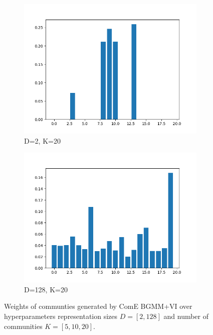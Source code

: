 \documentclass[conference]{IEEEtran}
\begin{document}
\begin{figure}
\begin{subfigure}[b]{.5\linewidth}
        \includegraphics[width=1\linewidth]{images/eval/weights_BGMM_d2_k20.png}
        \caption{D=2, K=20}
        \label{fig:dblp_weights_d2_k20}
    \end{subfigure}%
    \begin{subfigure}[b]{.5\linewidth}
        \centering
        \includegraphics[width=1\linewidth]{images/eval/weights_BGMM_d128_k20.png}
        \caption{D=128, K=20}
        \label{fig:dblp_weights_d128_k20}
    \end{subfigure}

    \caption{Weights of communties generated by ComE BGMM+VI over hyperparameters representation sizes $D=[2, 128]$ and number of communities $K=[5, 10, 20]$.}
    \label{fig:dblp_weights}
\end{figure}
\end{document}
